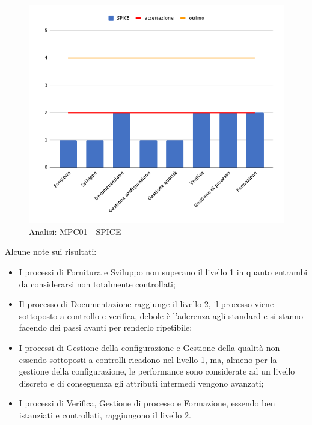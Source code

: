 \begin{figure}[H]
    \centering
    \includegraphics[scale=0.50]{Sezioni/images/analisi-spice.png}
    \caption{Analisi: MPC01 - SPICE}
\end{figure}

Alcune note sui risultati:
\begin{itemize}
\item I processi di Fornitura e Sviluppo non superano il livello 1 in quanto entrambi da considerarsi non totalmente controllati;
\item Il processo di Documentazione raggiunge il livello 2, il processo viene sottoposto a controllo e verifica, debole è l'aderenza agli standard e si stanno facendo dei passi avanti per renderlo ripetibile;
\item I processi di Gestione della configurazione e Gestione della qualità non essendo sottoposti a controlli ricadono nel livello 1, ma, almeno per la gestione della configurazione, le performance sono considerate ad un livello discreto e di conseguenza gli attributi intermedi vengono avanzati;
\item I processi di Verifica, Gestione di processo e Formazione, essendo ben istanziati e controllati, raggiungono il livello 2. 
\end{itemize}


